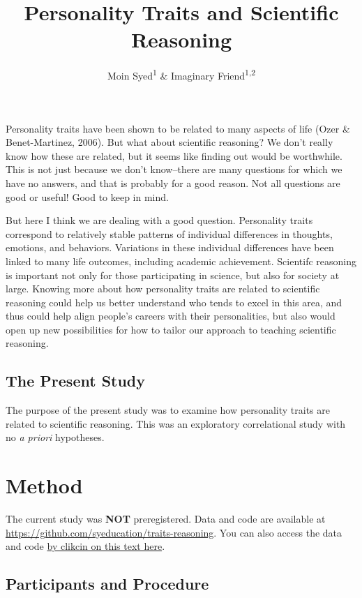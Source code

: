 \documentclass[
  english,
  man,floatsintext]{apa6}
\title{Personality Traits and Scientific Reasoning}
\author{Moin Syed\textsuperscript{1} \& Imaginary Friend\textsuperscript{1,2}}
\date{}
\affiliation{\vspace{0.5cm}\textsuperscript{1} University of Minnesota\\\textsuperscript{2} University of Darache}
\begin{document}
\maketitle

Personality traits have been shown to be related to many aspects of life (Ozer \& Benet-Martinez, 2006). But what about scientific reasoning? We don't really know how these are related, but it seems like finding out would be worthwhile. This is not just because we don't know--there are many questions for which we have no answers, and that is probably for a good reason. Not all questions are good or useful! Good to keep in mind.

But here I think we are dealing with a good question. Personality traits correspond to relatively stable patterns of individual differences in thoughts, emotions, and behaviors. Variations in these individual differences have been linked to many life outcomes, including academic achievement. Scientifc reasoning is important not only for those participating in science, but also for society at large. Knowing more about how personality traits are related to scientific reasoning could help us better understand who tends to excel in this area, and thus could help align people's careers with their personalities, but also would open up new possibilities for how to tailor our approach to teaching scientific reasoning.

\subsection{The Present Study}\label{the-present-study}

The purpose of the present study was to examine how personality traits are related to scientific reasoning. This was an exploratory correlational study with no \emph{a priori} hypotheses.

\section{Method}\label{method}

The current study was \textbf{NOT} preregistered. Data and code are available at \url{https://github.com/syeducation/traits-reasoning}.
You can also access the data and code \href{https://github.com/syeducation/traits-reasoning}{by clikcin on this text here}.

\subsection{Participants and Procedure}\label{participants-and-procedure}
\end{document}
